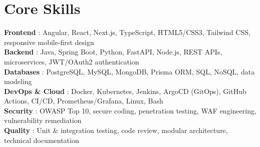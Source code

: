 \documentclass[a4paper,10pt]{article}
\begin{document}
\section{Core Skills}
\textbf{Frontend} : Angular, React, Next.js, TypeScript, HTML5/CSS3, Tailwind CSS, responsive mobile-first design\\[1pt]
\textbf{Backend} : Java, Spring Boot, Python, FastAPI, Node.js, REST APIs, microservices, JWT/OAuth2 authentication\\[1pt]
\textbf{Databases} : PostgreSQL, MySQL, MongoDB, Prisma ORM, SQL, NoSQL, data modeling\\[1pt]
\textbf{DevOps \& Cloud} : Docker, Kubernetes, Jenkins, ArgoCD (GitOps), GitHub Actions, CI/CD, Prometheus/Grafana, Linux, Bash\\[1pt]
\textbf{Security} : OWASP Top 10, secure coding, penetration testing, WAF engineering, vulnerability remediation\\[1pt]
\textbf{Quality} : Unit \& integration testing, code review, modular architecture, technical documentation

\end{document}
